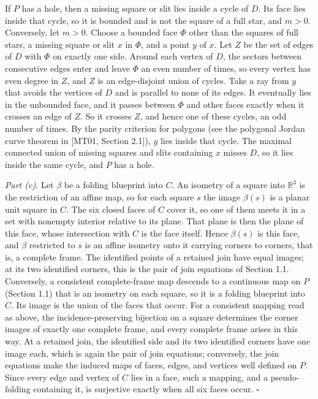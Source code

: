 \documentclass[
  11pt,
]{article}
\newcounter{none} %
\begin{document}
If \(P\) has a hole, then a missing square or slit lies inside a cycle
of \(D\). Its face lies inside that cycle, so it is bounded and is not
the square of a full star, and \(m>0\). Conversely, let \(m>0\). Choose
a bounded face \(\Phi\) other than the squares of full stars, a missing
square or slit \(x\) in \(\Phi\), and a point \(y\) of \(x\). Let \(Z\)
be the set of edges of \(D\) with \(\Phi\) on exactly one side. Around
each vertex of \(D\), the sectors between consecutive edges enter and
leave \(\Phi\) an even number of times, so every vertex has even degree
in \(Z\), and \(Z\) is an edge-disjoint union of cycles. Take a ray from
\(y\) that avoids the vertices of \(D\) and is parallel to none of its
edges. It eventually lies in the unbounded face, and it passes between
\(\Phi\) and other faces exactly when it crosses an edge of \(Z\). So it
crosses \(Z\), and hence one of these cycles, an odd number of times. By
the parity criterion for polygons (see the polygonal Jordan curve
theorem in {[}MT01, Section 2.1{]}), \(y\) lies inside that cycle. The
maximal connected union of missing squares and slits containing \(x\)
misses \(D\), so it lies inside the same cycle, and \(P\) has a hole.

\emph{Part (c).} Let \(\beta\) be a folding blueprint into \(C\). An
isometry of a square into \(\mathbb R^3\) is the restriction of an
affine map, so for each square \(s\) the image \(\beta(s)\) is a planar
unit square in \(C\). The six closed faces of \(C\) cover it, so one of
them meets it in a set with nonempty interior relative to its plane.
That plane is then the plane of this face, whose intersection with \(C\)
is the face itself. Hence \(\beta(s)\) is this face, and \(\beta\)
restricted to \(s\) is an affine isometry onto it carrying corners to
corners, that is, a complete frame. The identified points of a retained
join have equal images; at its two identified corners, this is the pair
of join equations of Section 1.1. Conversely, a consistent
complete-frame map descends to a continuous map on \(P\) (Section 1.1)
that is an isometry on each square, so it is a folding blueprint into
\(C\). Its image is the union of the faces that occur. For a consistent
mapping read as above, the incidence-preserving bijection on a square
determines the corner images of exactly one complete frame, and every
complete frame arises in this way. At a retained join, the identified
side and its two identified corners have one image each, which is again
the pair of join equations; conversely, the join equations make the
induced maps of faces, edges, and vertices well defined on \(P\). Since
every edge and vertex of \(C\) lies in a face, such a mapping, and a
pseudo-folding containing it, is surjective exactly when all six faces
occur. \(\square\)
\end{document}
